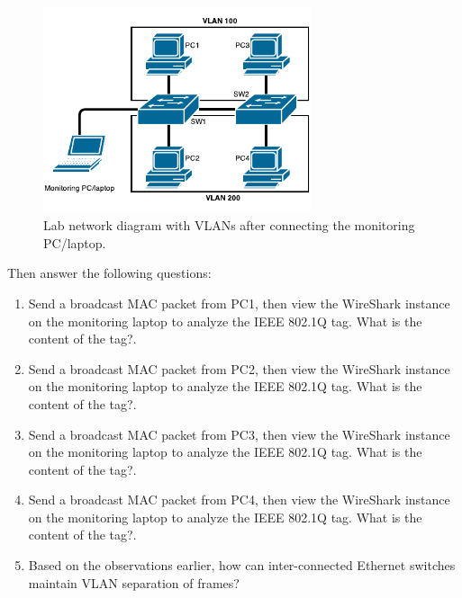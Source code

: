 \documentclass[pdftex,12pt,a4paper]{article}
\begin{document}
            \begin{figure}[tbh]
                \centering
                \includegraphics[width=0.7\textwidth]{figures/netdiag3}
                \caption{Lab network diagram with VLANs after connecting the
                monitoring PC/laptop.}
                \label{fig:netdiag3}
            \end{figure}

            Then answer the following questions:
            \begin{enumerate}
                \item Send a broadcast MAC packet from PC1, then view the
                    WireShark instance on the monitoring laptop to analyze the
                    IEEE 802.1Q tag. What is the content of the tag?.
                \item Send a broadcast MAC packet from PC2, then view the
                    WireShark instance on the monitoring laptop to analyze the
                    IEEE 802.1Q tag. What is the content of the tag?.
                \item Send a broadcast MAC packet from PC3, then view the
                    WireShark instance on the monitoring laptop to analyze the
                    IEEE 802.1Q tag. What is the content of the tag?.
                \item Send a broadcast MAC packet from PC4, then view the
                    WireShark instance on the monitoring laptop to analyze the
                    IEEE 802.1Q tag. What is the content of the tag?.
                \item Based on the observations earlier, how can
                    inter-connected Ethernet switches maintain VLAN separation
                    of frames?
            \end{enumerate}
\end{document}
